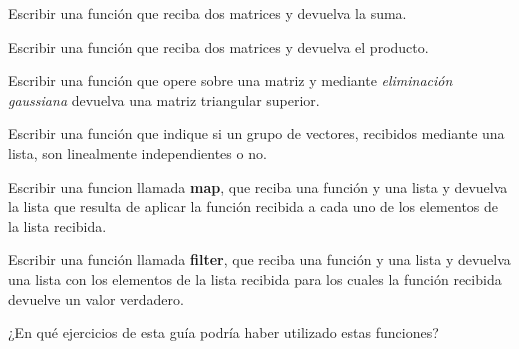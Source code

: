 

\begin{partes}
\item Escribir una función que reciba dos matrices y devuelva la suma.
\item Escribir una función que reciba dos matrices y devuelva el producto.
\item Escribir una función que opere sobre una matriz y mediante {\it
eliminación gaussiana} devuelva una matriz triangular superior.
\item Escribir una función que indique si un grupo de vectores, recibidos
mediante una lista, son linealmente independientes o no.
\end{partes}




\begin{partes}
\item Escribir una funcion llamada {\bf map}, que reciba una función y una
lista y devuelva la lista que resulta de aplicar la función recibida a
cada uno de los elementos de la lista recibida.
\item Escribir una función llamada {\bf filter}, que reciba una función y
una lista y devuelva una lista con los elementos de la lista recibida para
los cuales la función recibida devuelve un valor verdadero.
\item ¿En qué ejercicios de esta guía podría haber utilizado estas
funciones?
\end{partes}

